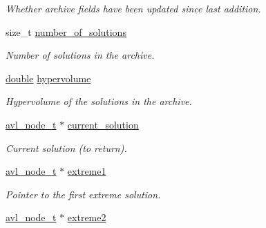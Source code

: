 \begin{DoxyCompactItemize}
\begin{DoxyCompactList}\small\item\em Whether archive fields have been updated since last addition. \end{DoxyCompactList}\item 
size\+\_\+t \hyperlink{structcoco__archive__s_a3682d2e60ddaa1f4a7d804c67f543bb5}{number\+\_\+of\+\_\+solutions}\hypertarget{structcoco__archive__s_a3682d2e60ddaa1f4a7d804c67f543bb5}{}\label{structcoco__archive__s_a3682d2e60ddaa1f4a7d804c67f543bb5}

\begin{DoxyCompactList}\small\item\em Number of solutions in the archive. \end{DoxyCompactList}\item 
\hyperlink{classdouble}{double} \hyperlink{structcoco__archive__s_ace3dd702484b57757f5a5f2f7cb48505}{hypervolume}\hypertarget{structcoco__archive__s_ace3dd702484b57757f5a5f2f7cb48505}{}\label{structcoco__archive__s_ace3dd702484b57757f5a5f2f7cb48505}

\begin{DoxyCompactList}\small\item\em Hypervolume of the solutions in the archive. \end{DoxyCompactList}\item 
\hyperlink{structavl__node}{avl\+\_\+node\+\_\+t} $\ast$ \hyperlink{structcoco__archive__s_a9a3326bbab3a075a5df81c2fd97af6d9}{current\+\_\+solution}\hypertarget{structcoco__archive__s_a9a3326bbab3a075a5df81c2fd97af6d9}{}\label{structcoco__archive__s_a9a3326bbab3a075a5df81c2fd97af6d9}

\begin{DoxyCompactList}\small\item\em Current solution (to return). \end{DoxyCompactList}\item 
\hyperlink{structavl__node}{avl\+\_\+node\+\_\+t} $\ast$ \hyperlink{structcoco__archive__s_ae0ae041af7f7effa505ce4ee60b58296}{extreme1}\hypertarget{structcoco__archive__s_ae0ae041af7f7effa505ce4ee60b58296}{}\label{structcoco__archive__s_ae0ae041af7f7effa505ce4ee60b58296}

\begin{DoxyCompactList}\small\item\em Pointer to the first extreme solution. \end{DoxyCompactList}\item 
\hyperlink{structavl__node}{avl\+\_\+node\+\_\+t} $\ast$ \hyperlink{structcoco__archive__s_a73562a59deb97f6a307cad4e362622d4}{extreme2}\hypertarget{structcoco__archive__s_a73562a59deb97f6a307cad4e362622d4}{}\label{structcoco__archive__s_a73562a59deb97f6a307cad4e362622d4}


\end{DoxyCompactItemize}
